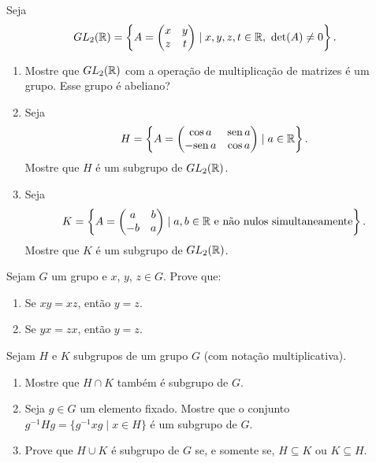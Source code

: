 \documentclass[12pt]{article}
\begin{document}
\questao Seja
\[
	GL_2(\mathbb{R}) = \left\{A = \begin{pmatrix}
		x & y\\z & t
	\end{pmatrix} \mid x, y, z, t \in \mathbb{R},\ \det(A) \ne 0\right\}.
\]
\begin{enumerate}[label=({\alph*})]
	\item Mostre que $GL_2(\mathbb{R})$ com a opera\c{c}\~ao de multiplica\c{c}\~ao de matrizes \'e um grupo. Esse grupo \'e abeliano?
	\item Seja
	\[
		H = \left\{ A = \begin{pmatrix}
			\cos a & {\rm sen\,} a\\ -{\rm sen\,} a & \cos a
		\end{pmatrix} \mid a \in \mathbb{R}\right\}.
	\]
	Mostre que $H$ \'e um subgrupo de $GL_2(\mathbb{R})$.
	\item Seja
	\[
		K = \left\{ A = \begin{pmatrix}
			a & b\\ -b & a
		\end{pmatrix} \mid a, b \in \mathbb{R} \mbox{ e n\~ao nulos simultaneamente}\right\}.
	\]
	Mostre que $K$ \'e um subgrupo de $GL_2(\mathbb{R})$.
\end{enumerate}

\vesp

\questao Sejam $G$ um grupo e $x$, $y$, $z \in G$. Prove que:
\begin{enumerate}[label=({\alph*})]
	\item Se $xy = xz$, ent\~ao $y = z$.
	\item Se $yx = zx$, ent\~ao $y = z$.
\end{enumerate}

\vesp

\questao Sejam $H$ e $K$ subgrupos de um grupo $G$ (com nota{\c c}{\~a}o
multiplicativa).
\begin{enumerate}[label=({\alph*})]
\item Mostre que $H\cap K$ tamb{\'e}m {\'e} subgrupo de $G$.
\item Seja $g\in G$ um elemento fixado. Mostre que o conjunto
$g^{-1}Hg=\{ g^{-1}xg \mid x\in H \} $ {\'e} um subgrupo de $G$.
\item Prove que $H\cup K$ {\'e} subgrupo de $G$ se, e somente se,
$H\subseteq K$ ou $K\subseteq H$.

\end{enumerate}
\end{document}
